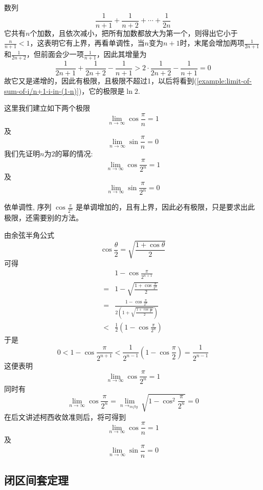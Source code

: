 \begin{example}
  数列
  \[ \frac{1}{n+1}+\frac{1}{n+2}+\cdots+\frac{1}{2n} \]
  它共有$n$个加数，且依次减小，把所有加数都放大为第一个，则得出它小于$\frac{n}{n+1}<1$，这表明它有上界，再看单调性，当$n$变为$n+1$时，末尾会增加两项$\frac{1}{2n+1}$和$\frac{1}{2n+2}$，但前面会少一项$\frac{1}{n+1}$，因此其增量为
  \[ \frac{1}{2n+1}+\frac{1}{2n+2}-\frac{1}{n+1} > 2 \cdot \frac{1}{2n+2} - \frac{1}{n+1} = 0 \]
  故它又是递增的，因此有极限，且极限不超过1，以后将看到(\autoref{example:limit-of-sum-of-i/n+1-i-in-(1-n)})，它的极限是$\ln{2}$.
\end{example}

\begin{example}
  \label{limit-of-cos-pi-frac-n}
  这里我们建立如下两个极限
  \[ \lim_{n\to\infty}\cos{\frac{\pi}{n}}=1 \]
  及
  \[ \lim_{n\to\infty}\sin{\frac{\pi}{n}}=0 \]
  我们先证明$n$为$2$的幂的情况:
  \[ \lim_{n\to\infty}\cos{\frac{\pi}{2^n}}=1 \]
  及
  \[ \lim_{n\to\infty}\sin{\frac{\pi}{2^n}}=0 \]

  依单调性, 序列 $\cos{\frac{\pi}{2^n}}$ 是单调增加的，且有上界，因此必有极限，只是要求出此极限，还需要别的方法。

  
  由余弦半角公式
  \[ \cos{\frac{\theta}{2}} = \sqrt{ \frac{1+\cos{\theta}}{2} } \]
  可得
  \begin{equation*}
    \begin{split}
        & 1-\cos{\frac{\pi}{2^{n+1}}} \\
        =& 1-\sqrt{\frac{1+\cos{\frac{\pi}{2^{n}}}}{2}} \\
      = & \frac{1-\cos{\frac{\pi}{2^{n}}}}{2 \left( 1+\sqrt{\frac{1+\cos{\frac{\pi}{2^{n}}}}{2}} \right)} \\
      < & \frac{1}{2} \left( 1-\cos{\frac{\pi}{2^{n}}} \right)
    \end{split}
  \end{equation*}
  于是
  \[ 0 < 1-\cos{\frac{\pi}{2^{n+1}}} < \frac{1}{2^{n-1}} \left( 1- \cos{\frac{\pi}{2}} \right) = \frac{1}{2^{n-1}} \]
  这便表明
  \[ \lim_{n\to\infty}\cos{\frac{\pi}{2^n}}=1 \]
  同时有
  \[ \lim_{n\to\infty}\cos{\frac{\pi}{2^n}} = \lim_{n\to_{infty}}\sqrt{1-\cos^2 \frac{\pi}{2^n} } = 0 \]
  在后文讲述柯西收敛准则后，将可得到
  \[ \lim_{n\to\infty}\cos{\frac{\pi}{n}}=1 \]
  及
  \[ \lim_{n\to\infty}\sin{\frac{\pi}{n}}=0 \]
\end{example}

\subsection{闭区间套定理}
\label{sec:theorem-of-closed-interval-sequence}

